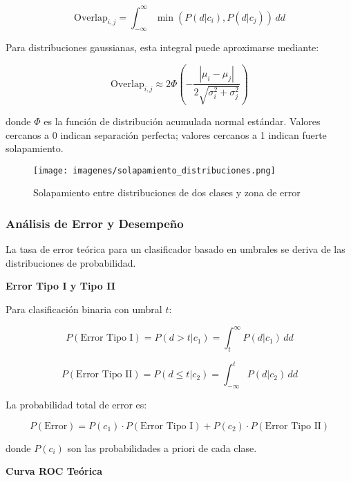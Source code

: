 \begin{equation}
\text{Overlap}_{i,j} = \int_{-\infty}^{\infty} \min(P(d|c_i), P(d|c_j)) \, dd
\end{equation}

Para distribuciones gaussianas, esta integral puede aproximarse mediante:

\begin{equation}
\text{Overlap}_{i,j} \approx 2\Phi\left(-\frac{|\mu_i - \mu_j|}{2\sqrt{\sigma_i^2 + \sigma_j^2}}\right)
\end{equation}

donde $\Phi$ es la función de distribución acumulada normal estándar. Valores cercanos a 0 indican separación perfecta; valores cercanos a 1 indican fuerte solapamiento.

\begin{figure}[h]
\centering
\texttt{[image: imagenes/solapamiento\_distribuciones.png]}
\caption{Solapamiento entre distribuciones de dos clases y zona de error}
\label{fig:solapamiento}
\end{figure}

\subsubsection{Análisis de Error y Desempeño}

La tasa de error teórica para un clasificador basado en umbrales se deriva de las distribuciones de probabilidad.

\textbf{Error Tipo I y Tipo II}

Para clasificación binaria con umbral $t$:

\begin{equation}
P(\text{Error Tipo I}) = P(d > t | c_1) = \int_t^{\infty} P(d|c_1) \, dd
\end{equation}

\begin{equation}
P(\text{Error Tipo II}) = P(d \leq t | c_2) = \int_{-\infty}^{t} P(d|c_2) \, dd
\end{equation}

La probabilidad total de error es:

\begin{equation}
P(\text{Error}) = P(c_1) \cdot P(\text{Error Tipo I}) + P(c_2) \cdot P(\text{Error Tipo II})
\end{equation}

donde $P(c_i)$ son las probabilidades a priori de cada clase.

\textbf{Curva ROC Teórica}


